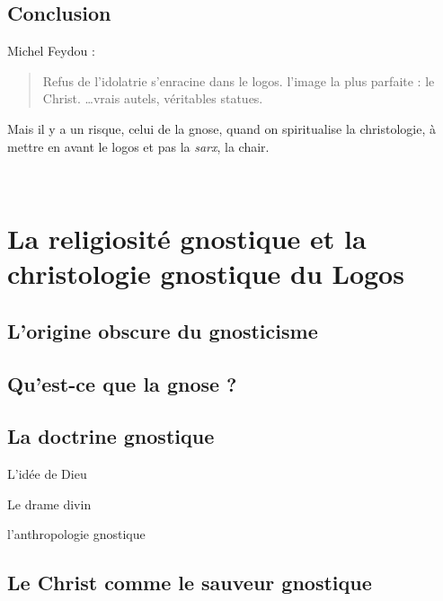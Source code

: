 \subsection{Conclusion}

Michel Feydou : 
\begin{quote}
    Refus de l'idolatrie s'enracine dans le logos. 
    l'image la plus parfaite : le Christ. \ldots vrais autels, véritables statues.
\end{quote}
  
  Mais il y a un risque, celui de la gnose, quand on spiritualise la christologie, à mettre en avant le logos et pas la \textit{sarx}, la chair.
  
 ~
  \hypertarget{la-religiosituxe9-gnostique-et-la-christologie-gnostique-du-logos}{%
  \section{La religiosité gnostique et la christologie gnostique du
  Logos}\label{la-religiosituxe9-gnostique-et-la-christologie-gnostique-du-logos}}

  
  
  
    
    \subsection{L'origine obscure du gnosticisme}
    
  
    
    \subsection{Qu'est-ce que la gnose ?}
    
  
    
    \subsection{La doctrine gnostique}
    

    
    
    
      
      L'idée de Dieu
      
    
      
      Le drame divin
      
    
      
      l'anthropologie gnostique
      
    
  
    
    \subsection{Le Christ comme le sauveur gnostique}
    

